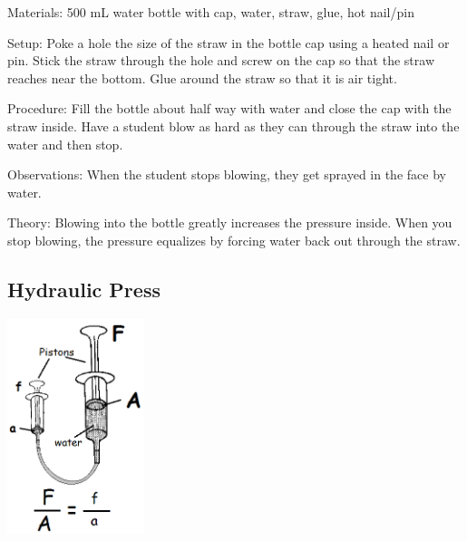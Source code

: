 \begin{multicols}{2}
\begin{description*}
\item[Materials:]{500 mL water bottle with cap, water, straw, glue, hot nail/pin}
\item[Setup:]{Poke a hole the size of the straw in the bottle cap using a heated nail or pin. Stick the straw through the hole and screw on the cap so that the straw reaches near the bottom. Glue around the straw so that it is air tight.}
\item[Procedure:]{Fill the bottle about half way with water and close the cap with the straw inside. Have a student blow as hard as they can through the straw into the water and then stop.}
\item[Observations:]{When the student stops blowing, they get sprayed in the face by water.}
\item[Theory:]{Blowing into the bottle greatly increases the pressure inside. When you stop blowing, the pressure equalizes by forcing water back out through the straw.}
\end{description*}

\subsection{Hydraulic Press} 

\begin{center}
\includegraphics[width=0.3\textwidth]{./img/source/hydraulic-press.png}
\end{center}

\columnbreak


\end{multicols}
